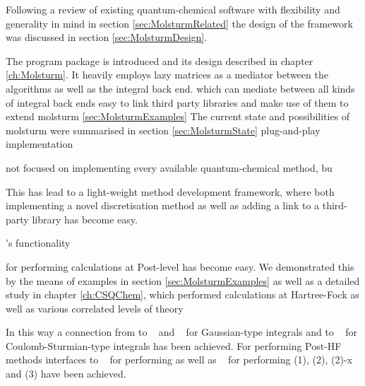 
Following a review of existing quantum-chemical software
with flexibility and generality in mind in section \vref{sec:MolsturmRelated}
the design of the \molsturm framework was discussed in section \vref{sec:MolsturmDesign}.







The program package \molsturm is introduced and its design described
in chapter \vref{ch:Molsturm}.
It heavily employs lazy matrices as a mediator between
the \SCF algorithms as well as the integral back end.
which can mediate between all kinds of integral back ends
%
easy to link third party libraries and make use of them
to extend molsturm
\vref{sec:MolsturmExamples}
The current state and possibilities of molsturm
were summarised in section \vref{sec:MolsturmState}
plug-and-play implementation







not focused on implementing every available quantum-chemical method,
bu

This has lead to a light-weight method development framework,
where both implementing a novel discretisation method
as well as adding a link to a third-party library has become easy.


\molsturm's functionality 

for performing
calculations at Post-\HF level has become easy.
We demonstrated this by the means of examples in section \vref{sec:MolsturmExamples}
as well as a detailed study in chapter \vref{ch:CSQChem},
which performed calculations
at Hartree-Fock as well as various correlated levels of theory



In this way a connection from \molsturm
to \libint~\cite{Libint2_231,Libint2} and \libcint~\cite{Sun2015}
for Gaussian-type integrals
and to \sturmint~\cite{sturmintWeb}
for Coulomb-Sturmian-type integrals has been achieved.
For performing Post-HF methods
interfaces to \pyscf~\cite{Sun2017}
for performing \FCI as well as \adcman~\cite{Wormit2014}
for performing {\ADC}(1), {\ADC}(2), {\ADC}(2)-x and {\ADC}(3)
have been achieved.


